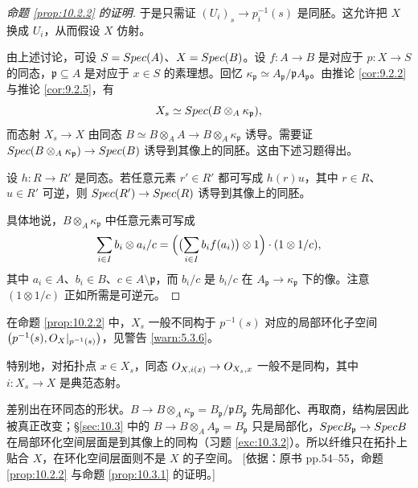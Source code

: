 \begin{proof}[命题 \ref{prop:10.2.2} 的证明]
于是只需证 $(U_i)_s \to p_i^{-1}(s)$ 是同胚。这允许把 $X$ 换成 $U_i$，从而假设 $X$ 仿射。

由上述讨论，可设 $S = Spec(A)$、$X = Spec(B)$。设 $f \colon A \to B$ 是对应于 $p \colon X \to S$ 的同态，$\mathfrak p \subseteq A$ 是对应于 $x \in S$ 的素理想。回忆 $\kappa_{\mathfrak p} \simeq A_{\mathfrak p}/\mathfrak p A_{\mathfrak p}$。由推论 \ref{cor:9.2.2} 与推论 \ref{cor:9.2.5}，有
\[
X_s \simeq Spec(B \otimes_A \kappa_{\mathfrak p}),
\]
而态射 $X_s \to X$ 由同态 $B \simeq B \otimes_A A \to B \otimes_A \kappa_{\mathfrak p}$ 诱导。需要证 $Spec(B \otimes_A \kappa_{\mathfrak p}) \to Spec(B)$ 诱导到其像上的同胚。这由下述习题得出。

\begin{exercise}\label{exc:10.2.4}
设 $h \colon R \to R'$ 是同态。若任意元素 $r' \in R'$ 都可写成 $h(r)u$，其中 $r \in R$、$u \in R'$ 可逆，则 $Spec(R') \to Spec(R)$ 诱导到其像上的同胚。
\end{exercise}

具体地说，$B \otimes_A \kappa_{\mathfrak p}$ 中任意元素可写成
\[
\sum_{i \in I} b_i \otimes a_i/c = \Bigl(\bigl(\sum_{i \in I} b_i f(a_i)\bigr) \otimes 1\Bigr) \cdot (1 \otimes 1/c),
\]
其中 $a_i \in A$、$b_i \in B$、$c \in A \setminus \mathfrak p$，而 $b_i/c$ 是 $b_i/c$ 在 $A_{\mathfrak p} \to \kappa_{\mathfrak p}$ 下的像。注意 $(1 \otimes 1/c)$ 正如所需是可逆元。
\end{proof}

\begin{warning}\label{warn:10.2.5}
在命题 \ref{prop:10.2.2} 中，$X_s$ 一般不同构于 $p^{-1}(s)$ 对应的局部环化子空间 $\bigl(p^{-1}(s), O_X|_{p^{-1}(s)}\bigr)$，见警告 \ref{warn:5.3.6}。

特别地，对拓扑点 $x \in X_s$，同态 $O_{X,i(x)} \to O_{X_s,x}$ 一般不是同构，其中 $i \colon X_s \to X$ 是典范态射。
\end{warning}

\begin{yizhu}
差别出在环同态的形状。$B \to B \otimes_A \kappa_{\mathfrak p} = B_{\mathfrak p}/\mathfrak p B_{\mathfrak p}$ 先局部化、再取商，结构层因此被真正改变；\S\ref{sec:10.3} 中的 $B \to B \otimes_A A_{\mathfrak p} = B_{\mathfrak p}$ 只是局部化，$Spec B_{\mathfrak p} \to Spec B$ 在局部环化空间层面是到其像上的同构（习题 \ref{exc:10.3.2}）。所以纤维只在拓扑上贴合 $X$，在环化空间层面则不是 $X$ 的子空间。
[依据：原书 pp.54--55，命题 \ref{prop:10.2.2} 与命题 \ref{prop:10.3.1} 的证明。]
\end{yizhu}

